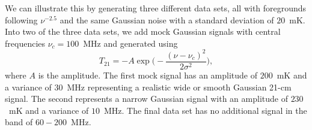 We can illustrate this by generating three different data sets, all with foregrounds following $\nu^{-2.5}$ and the same Gaussian noise with a standard deviation of $20$~mK. Into two of the three data sets, we add mock Gaussian signals with central frequencies $\nu_c = 100$~MHz and generated using
\begin{equation}
    T_{21} = -A \exp\bigg(-\frac{(\nu - \nu_c)^2}{2\sigma^2}\bigg),
\end{equation}
where $A$ is the amplitude. The first mock signal has an amplitude of $200$~mK and a variance of $30$~MHz representing a realistic wide or smooth Gaussian 21-cm signal. The second represents a narrow Gaussian signal with an amplitude of $230$~mK and a variance of $10$~MHz. The final data set has no additional signal in the band of $60 - 200$~MHz.

